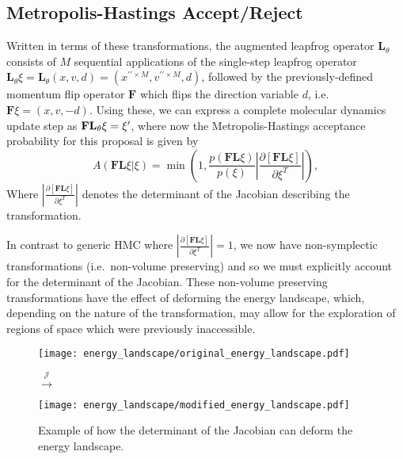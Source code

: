 \documentclass[../main.tex]{subfiles}
\begin{document}
\subsection{Metropolis-Hastings Accept/Reject}
%
Written in terms of these transformations, the augmented leapfrog operator
$\mathbf{L}_{\theta}$ consists of $M$ sequential applications of the
single-step leapfrog operator $\mathbf{L}_{\theta} \xi = \mathbf{L}_{\theta}(x,
v, d) = (x^{\prime\prime\times M}, v^{\prime\prime\times M}, d)$, followed by
the previously-defined momentum flip operator $\mathbf{F}$ which flips the
direction variable $d$, i.e.\ $\mathbf{F}\xi = (x, v, -d)$.
%
Using these, we can express a complete molecular dynamics update step as
$\mathbf{FL}_{\theta}\xi = {\xi^{\prime}}$, where now the Metropolis-Hastings acceptance
probability for this proposal is given by
%
\begin{equation}
    A(\mathbf{F}\mathbf{L} \xi | \xi) = \min\left(1,
        \frac{p(\mathbf{F}\mathbf{L}\xi)}{p(\xi)}\left|
        \frac{\partial\left[\mathbf{F}\mathbf{L}\xi\right]}
            {\partial\xi^{T}}\right|\right),
\end{equation}
%
Where $\left|\frac{\partial\left[\mathbf{F}\mathbf{L}\xi\right]}
{\partial\xi^{T}}\right|$ denotes the determinant of the Jacobian describing
the transformation.

In contrast to generic HMC where
$\left|\frac{\partial\left[\mathbf{F}\mathbf{L}\xi\right]}
{\partial\xi^{T}}\right| = 1$, we now have non-symplectic transformations
(i.e.\ non-volume preserving) and so we must explicitly account for the
determinant of the Jacobian.
%
These non-volume preserving transformations have the effect of deforming the
energy landscape, which, depending on the nature of the transformation, may
allow for the exploration of regions of space which were previously
inaccessible.
%
\newcommand{\energyA}{\texttt{[image: energy\_landscape/original\_energy\_landscape.pdf]}}
\newcommand{\energyB}{\texttt{[image: energy\_landscape/modified\_energy\_landscape.pdf]}}
%
\begin{figure}
  \centering 
  \Huge
  \parbox{\widthof{\energyA}}{\energyA} $\overset{\mathcal{J}}{\longrightarrow}$
  \parbox{\widthof{\energyB}}{\energyB} 
  \normalsize
  \caption{Example of how the determinant of the Jacobian can deform the energy landscape.}
\end{figure}
\end{document}
